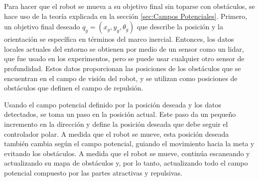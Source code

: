 Para hacer que el robot se mueva a su objetivo final sin toparse con obstáculos, se 
hace uso de la teoría explicada en la sección \ref{sec:Campos Potenciales}. Primero, un 
objetivo final deseado $q_{g} =(x_{g}, y_{g}, \theta_{g})$ que describe la posición y la 
orientación se específica en términos del marco inercial. Entonces, los datos locales 
actuales del entorno se obtienen por medio de un sensor como un lidar, que fue usado en 
los experimentos, pero se puede usar cualquier otro sensor de profundidad. Estos datos 
proporcionan las posiciones de los obstáculos que se encuentran en el campo de visión del 
robot, y se utilizan como posiciones de obstáculos que definen el campo de repulsión. 

Usando el campo potencial definido por la posición deseada y los datos detectados, se toma un 
paso en la posición actual. Este paso da un pequeño incremento en la dirección y define la 
posición deseada que debe seguir el controlador polar. A medida que el robot se mueve, esta 
posición deseada también cambia según el campo potencial, guiando el movimiento hacia la meta 
y evitando los obstáculos. A medida que el robot se mueve, continúa escaneando y actualizando 
su mapa de obstáculos y, por lo tanto, actualizando todo el campo potencial compuesto por las 
partes atractivas y repulsivas.

